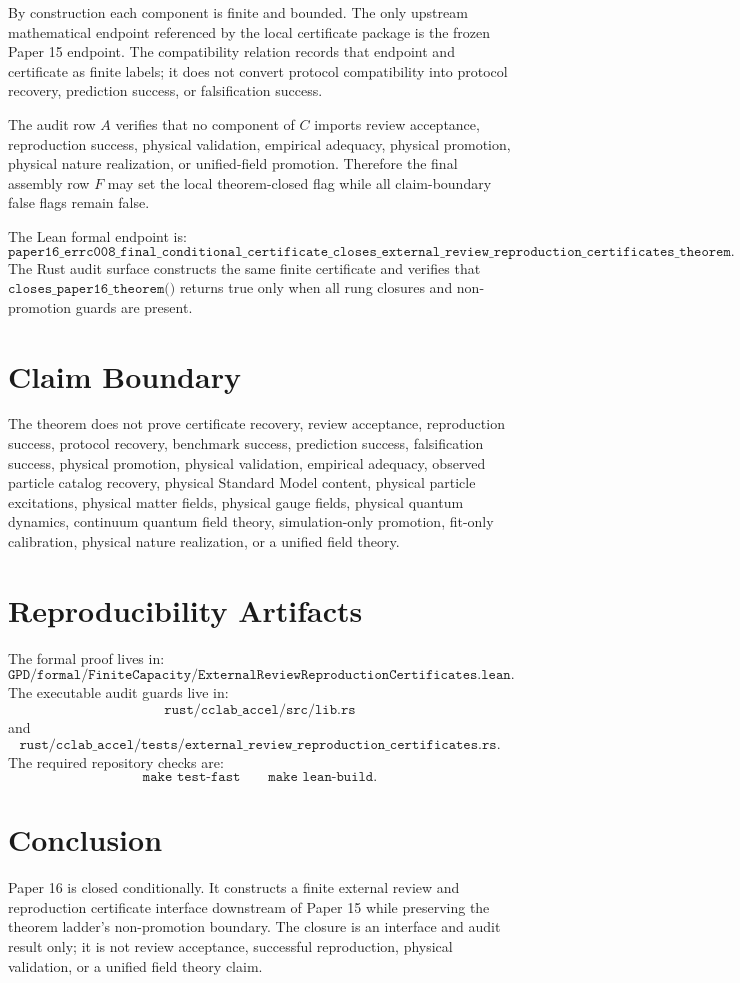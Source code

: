 \documentclass{article}
\begin{document}
By construction each component is finite and bounded. The only upstream
mathematical endpoint referenced by the local certificate package is the
frozen Paper 15 endpoint. The compatibility relation records that endpoint
and certificate as finite labels; it does not convert protocol compatibility
into protocol recovery, prediction success, or falsification success.

The audit row \(A\) verifies that no component of \(C\) imports review
acceptance, reproduction success, physical validation, empirical adequacy,
physical promotion, physical nature realization, or unified-field promotion.
Therefore the final assembly row \(F\) may set the local theorem-closed flag
while all claim-boundary false flags remain false.

The Lean formal endpoint is:
\[
\texttt{paper16\_errc008\_final\_conditional\_certificate\_closes\_external\_review\_reproduction\_certificates\_theorem}.
\]
The Rust audit surface constructs the same finite certificate and verifies
that \(\texttt{closes\_paper16\_theorem()}\) returns true only when all rung
closures and non-promotion guards are present.

\section{Claim Boundary}

The theorem does not prove certificate recovery, review acceptance,
reproduction success, protocol recovery, benchmark success, prediction
success, falsification success, physical promotion, physical validation,
empirical adequacy, observed particle catalog recovery, physical Standard
Model content, physical particle excitations, physical matter fields,
physical gauge fields, physical quantum dynamics, continuum quantum field
theory, simulation-only promotion, fit-only calibration, physical nature
realization, or a unified field theory.

\section{Reproducibility Artifacts}

The formal proof lives in:
\[
\texttt{GPD/formal/FiniteCapacity/ExternalReviewReproductionCertificates.lean}.
\]
The executable audit guards live in:
\[
\texttt{rust/cclab\_accel/src/lib.rs}
\]
and
\[
\texttt{rust/cclab\_accel/tests/external\_review\_reproduction\_certificates.rs}.
\]
The required repository checks are:
\[
\texttt{make test-fast}
\qquad
\texttt{make lean-build}.
\]

\section{Conclusion}

Paper 16 is closed conditionally. It constructs a finite external review and
reproduction certificate interface downstream of Paper 15 while preserving
the theorem ladder's non-promotion boundary. The closure is an interface and
audit result only; it is not review acceptance, successful reproduction,
physical validation, or a unified field theory claim.
\end{document}

